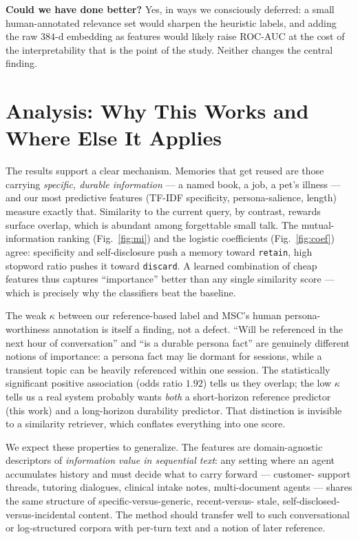 \documentclass[11pt]{article}
\begin{document}


\textbf{Could we have done better?} Yes, in ways we consciously deferred: a small
human-annotated relevance set would sharpen the heuristic labels, and adding the
raw $384$-d embedding as features would likely raise ROC-AUC at the cost of the
interpretability that is the point of the study. Neither changes the central
finding.

\section{Analysis: Why This Works and Where Else It Applies}\label{sec:analysis}
The results support a clear mechanism. Memories that get reused are those carrying
\emph{specific, durable information} --- a named book, a job, a pet's illness ---
and our most predictive features (TF-IDF specificity, persona-salience, length)
measure exactly that. Similarity to the current query, by contrast, rewards
surface overlap, which is abundant among forgettable small talk. The mutual-
information ranking (Fig.~\ref{fig:mi}) and the logistic coefficients
(Fig.~\ref{fig:coef}) agree: specificity and self-disclosure push a memory toward
\texttt{retain}, high stopword ratio pushes it toward \texttt{discard}. A learned
combination of cheap features thus captures ``importance'' better than any single
similarity score --- which is precisely why the classifiers beat the baseline.

The weak $\kappa$ between our reference-based label and MSC's human persona-
worthiness annotation is itself a finding, not a defect. ``Will be referenced in
the next hour of conversation'' and ``is a durable persona fact'' are genuinely
different notions of importance: a persona fact may lie dormant for sessions, while
a transient topic can be heavily referenced within one session. The statistically
significant positive association (odds ratio $1.92$) tells us they overlap; the low
$\kappa$ tells us a real system probably wants \emph{both} a short-horizon
reference predictor (this work) and a long-horizon durability predictor. That
distinction is invisible to a similarity retriever, which conflates everything into
one score.

We expect these properties to generalize. The features are domain-agnostic
descriptors of \emph{information value in sequential text}: any setting where an
agent accumulates history and must decide what to carry forward --- customer-
support threads, tutoring dialogues, clinical intake notes, multi-document
agents --- shares the same structure of specific-versus-generic, recent-versus-
stale, self-disclosed-versus-incidental content. The method should transfer well
to such conversational or log-structured corpora with per-turn text and a notion of
later reference.
\end{document}

